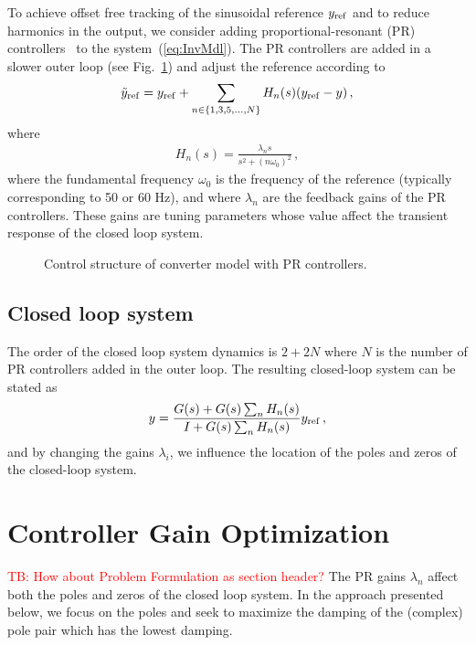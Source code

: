 \documentclass[conference,10pt]{IEEEtran}
\newcommand{\tb}[1]{\textcolor{red}{TB: #1}}
\begin{document}
To achieve offset free tracking of the sinusoidal reference $y_{\rm ref}$ and to reduce harmonics in the output, we consider adding proportional-resonant (PR) controllers~\cite{fukuda2001novel} to the system~(\ref{eq:InvMdl}).
The PR controllers are added in a slower outer loop (see Fig.~\ref{fig:ControlStructure}) and adjust the reference according to
\begin{align*}
\tilde{y}_{\rm ref} = y_{\rm ref} + \sum_{n\in\{1,3,5,\dots, N\}}H_n(s)(y_{\rm ref}-y)\,,
\end{align*}
where
\begin{align*}
H_n(s) = \frac{\lambda_ns}{s^2 + (n\omega_0)^2}\,,
\end{align*}
where the fundamental frequency $\omega_0$ is the frequency of the reference (typically corresponding to 50 or 60 Hz), and where $\lambda_n$ are the feedback gains of the PR controllers. These gains are tuning parameters whose value affect the transient response of the closed loop system.

\begin{figure}[!h]
\centering

\caption{Control structure of converter model with PR controllers.}
\label{fig:ControlStructure}
\end{figure}


\subsection{Closed loop system}

The order of the closed loop system dynamics is $2+2N$ where $N$ is the number of PR controllers added in the outer loop. The resulting closed-loop system can be stated as
\begin{align}\label{eq:ClosedLoopTF}
  y = \frac{G(s) + G(s) \sum_n H_n(s)}{I + G(s) \sum_n H_n(s)} y_{\rm ref}\,,
\end{align}
and by changing the gains $\lambda_i$, we influence the location of the poles and zeros of the closed-loop system.

\section{Controller Gain Optimization}
\tb{How about Problem Formulation as section header?}
The PR gains $\lambda_n$ affect both the poles and zeros of the closed loop system. In the approach presented below, we focus on the poles and seek to maximize the damping of the (complex) pole pair which has the lowest damping.
\end{document}
